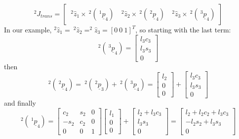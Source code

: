 \documentclass[]{article}
\begin{document}
\begin{displaymath}
^{2}J_{trans} = \left[ \begin{array}{ccc} \ \!^{2}\hat{z}_{1} \times \ \!^{2}(\ \!^{1}\underline{p}_{4}) & \ \!^{2}\hat{z}_{2} \times \ \!^{2}(\ \!^{2}\underline{p}_{4}) & \ \!^{2}\hat{z}_{3} \times \ \!^{2}(\ \!^{3}\underline{p}_{4})\end{array}\right]
\end{displaymath}
In our example, $^{2}\hat{z}_{1} = \ \!^{2}\hat{z}_{2} = ^{2}\hat{z}_{3} = [0\ 0\ 1]^{T}$, so starting with the last term:
\begin{displaymath}
^{2}(\ \!^{3}\underline{p}_{4}) = \left[ \begin{array}{c} l_{3}c_{3} \\ l_{3}s_{3} \\ 0 \end{array}\right]
\end{displaymath}
then
\begin{displaymath}
^{2}(\ \!^{2}\underline{p}_{4}) = \ \!^{2}(\ \!^{2}\underline{p}_{3}) + \ \!^{2}(\ \!^{3}\underline{p}_{4}) = \left[ \begin{array}{c} l_{2} \\ 0 \\ 0 \end{array} \right] + \left[ \begin{array}{c} l_{3}c_{3} \\ l_{3}s_{3} \\ 0 \end{array}\right]
\end{displaymath}
and finally
\begin{displaymath}
^{2}(\ \!^{1}\underline{p}_{4}) = \left[\begin{array}{ccc}c_{2} & s_{2} & 0 \\ -s_{2} & c_{2} & 0 \\ 0 & 0 & 1 \end{array}\right]\left[\begin{array}{c} l_{1} \\ 0 \\ 0 \end{array}\right] + \left[\begin{array}{c} l_{2} + l_{3}c_{3} \\ l_{3}s_{3} \\ 0 \end{array} \right] = \left[\begin{array}{c} l_{2}+l_{2}c_{2}+l_{3}c_{3} \\ -l_{2}s_{2} + l_{3}s_{3} \\ 0 \end{array}\right]
\end{displaymath}
\end{document}
